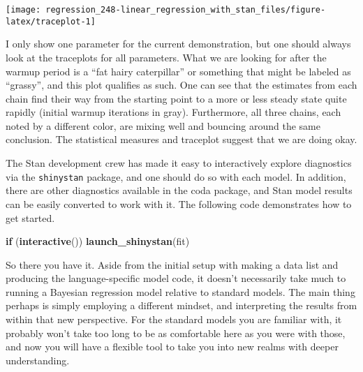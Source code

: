 \documentclass[]{book}
\newenvironment{Shaded}{\begin{snugshade}}{\end{snugshade}}
\newcommand{\CommentTok}[1]{\textcolor[rgb]{0.56,0.35,0.01}{\textit{#1}}}
\newcommand{\ControlFlowTok}[1]{\textcolor[rgb]{0.13,0.29,0.53}{\textbf{#1}}}
\newcommand{\DataTypeTok}[1]{\textcolor[rgb]{0.13,0.29,0.53}{#1}}
\newcommand{\KeywordTok}[1]{\textcolor[rgb]{0.13,0.29,0.53}{\textbf{#1}}}
\newcommand{\NormalTok}[1]{#1}
\newcommand{\OperatorTok}[1]{\textcolor[rgb]{0.81,0.36,0.00}{\textbf{#1}}}
\newcommand{\StringTok}[1]{\textcolor[rgb]{0.31,0.60,0.02}{#1}}
\begin{document}
\begin{center}\texttt{[image: regression\_248-linear\_regression\_with\_stan\_files/figure-latex/traceplot-1]} \end{center}

I only show one parameter for the current demonstration, but one should always look at the traceplots for all parameters. What we are looking for after the warmup period is a ``fat hairy caterpillar'' or something that might be labeled as ``grassy'', and this plot qualifies as such. One can see that the estimates from each chain find their way from the starting point to a more or less steady state quite rapidly (initial warmup iterations in gray). Furthermore, all three chains, each noted by a different color, are mixing well and bouncing around the same conclusion. The statistical measures and traceplot suggest that we are doing okay.

The Stan development crew has made it easy to interactively explore diagnostics via the \texttt{shinystan} package, and one should do so with each model. In addition, there are other diagnostics available in the coda package, and Stan model results can be easily converted to work with it. The following code demonstrates how to get started.

\begin{Shaded}
\end{Shaded}

\begin{Shaded}
\begin{Highlighting}[]
\ControlFlowTok{if}\NormalTok{ (}\KeywordTok{interactive}\NormalTok{()) }\KeywordTok{launch_shinystan}\NormalTok{(fit)}
\end{Highlighting}
\end{Shaded}

So there you have it. Aside from the initial setup with making a data list and producing the language-specific model code, it doesn't necessarily take much to running a Bayesian regression model relative to standard models. The main thing perhaps is simply employing a different mindset, and interpreting the results from within that new perspective. For the standard models you are familiar with, it probably won't take too long to be as comfortable here as you were with those, and now you will have a flexible tool to take you into new realms with deeper understanding.


\end{document}
